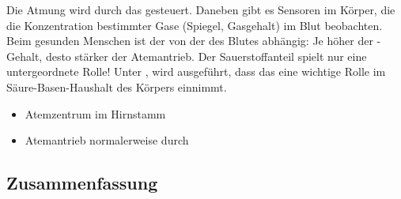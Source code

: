 {%
Die Atmung wird durch das 
gesteuert. 
%
Daneben gibt es Sensoren im Körper, 
die die Konzentration bestimmter Gase 
(Spiegel, Gasgehalt) 
im Blut beobachten.
%
Beim gesunden Menschen ist der  von der  des Blutes abhängig: 
%
Je höher der -Gehalt, desto stärker der Atemantrieb. 
%
Der Sauerstoffanteil spielt nur eine untergeordnete Rolle! Unter
, wird
ausgeführt, dass das  eine wichtige Rolle im
Säure-Basen-Haushalt des Körpers einnimmt.


}{
\begin{itemize}
  \item Atemzentrum im Hirnstamm
  \item Atemantrieb normalerweise durch 
\end{itemize}
}{}{}{}

\begin{Synopsis}
\end{Synopsis}



\subsection{Zusammenfassung}

